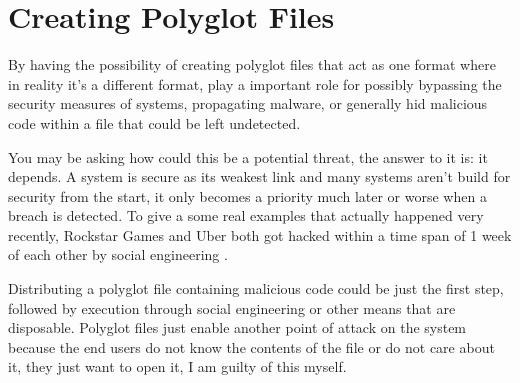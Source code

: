 \section{Creating Polyglot Files}
By having the possibility of creating polyglot files that act as one format where in reality it's a different format, play a important role for
possibly bypassing the security measures of systems, propagating malware, or generally hid malicious code within a file that could be left undetected.

You may be asking how could this be a potential threat, the answer to it is: it depends. A system is secure as its weakest link and many systems
aren't build for security from the start, it only becomes a priority much later or worse when a breach is detected. To give a some real examples that
actually happened very recently, Rockstar Games and Uber both got hacked within a time span of 1 week of each other by social engineering \cite{Uber, Rockstar}.

Distributing a polyglot file containing malicious code could be just the first step,
followed by execution through social engineering or other means that are disposable. 
Polyglot files just enable another point of attack on the system because the end users do not know the contents of the file or do not care about it,
they just want to open it, I am guilty of this myself.
